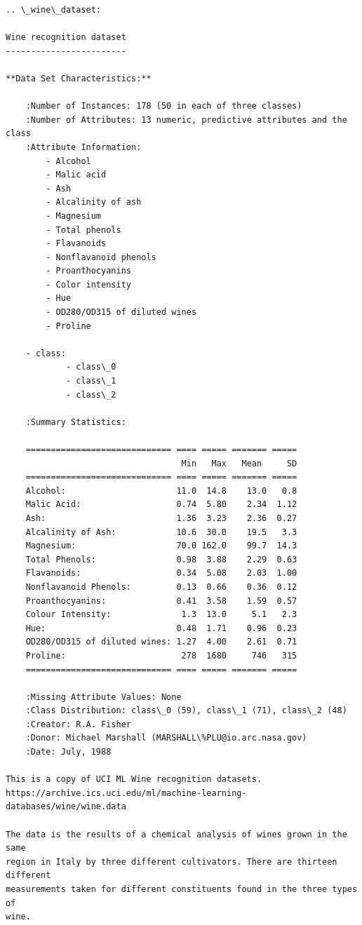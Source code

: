 \documentclass[11pt]{article}
\begin{document}
    \begin{Verbatim}[commandchars=\\\{\}]
.. \_wine\_dataset:

Wine recognition dataset
------------------------

**Data Set Characteristics:**

    :Number of Instances: 178 (50 in each of three classes)
    :Number of Attributes: 13 numeric, predictive attributes and the class
    :Attribute Information:
 		- Alcohol
 		- Malic acid
 		- Ash
		- Alcalinity of ash  
 		- Magnesium
		- Total phenols
 		- Flavanoids
 		- Nonflavanoid phenols
 		- Proanthocyanins
		- Color intensity
 		- Hue
 		- OD280/OD315 of diluted wines
 		- Proline

    - class:
            - class\_0
            - class\_1
            - class\_2
		
    :Summary Statistics:
    
    ============================= ==== ===== ======= =====
                                   Min   Max   Mean     SD
    ============================= ==== ===== ======= =====
    Alcohol:                      11.0  14.8    13.0   0.8
    Malic Acid:                   0.74  5.80    2.34  1.12
    Ash:                          1.36  3.23    2.36  0.27
    Alcalinity of Ash:            10.6  30.0    19.5   3.3
    Magnesium:                    70.0 162.0    99.7  14.3
    Total Phenols:                0.98  3.88    2.29  0.63
    Flavanoids:                   0.34  5.08    2.03  1.00
    Nonflavanoid Phenols:         0.13  0.66    0.36  0.12
    Proanthocyanins:              0.41  3.58    1.59  0.57
    Colour Intensity:              1.3  13.0     5.1   2.3
    Hue:                          0.48  1.71    0.96  0.23
    OD280/OD315 of diluted wines: 1.27  4.00    2.61  0.71
    Proline:                       278  1680     746   315
    ============================= ==== ===== ======= =====

    :Missing Attribute Values: None
    :Class Distribution: class\_0 (59), class\_1 (71), class\_2 (48)
    :Creator: R.A. Fisher
    :Donor: Michael Marshall (MARSHALL\%PLU@io.arc.nasa.gov)
    :Date: July, 1988

This is a copy of UCI ML Wine recognition datasets.
https://archive.ics.uci.edu/ml/machine-learning-databases/wine/wine.data

The data is the results of a chemical analysis of wines grown in the same
region in Italy by three different cultivators. There are thirteen different
measurements taken for different constituents found in the three types of
wine.


\end{Verbatim}
\end{document}
